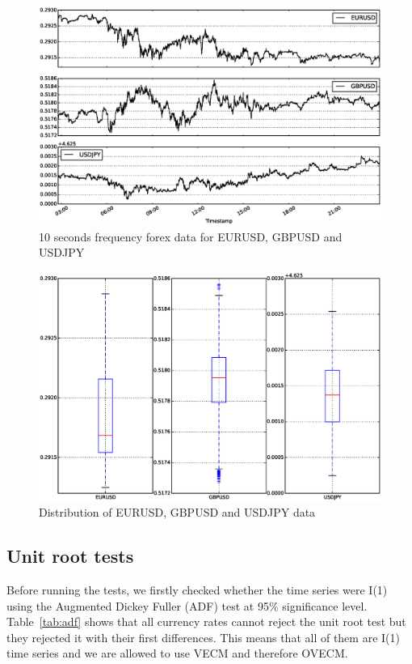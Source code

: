 \documentclass[twocolumn]{svjour3}          %
\begin{document}
\hspace*{-1.5in}
\begin{figure}[!ht]
  \vspace*{-1cm}
  \hspace*{-0.4in}
  \centering
  \includegraphics[scale=0.34]{forexdata}
  \caption{10 seconds frequency forex data for EURUSD, GBPUSD and USDJPY}
  \label{fig:forexdata}
\end{figure}

\begin{figure}[!ht]
  \vspace*{-1cm}
  \hspace*{-0.3in}
  \centering
  \includegraphics[scale=0.3]{distdata}
  \caption{Distribution of EURUSD, GBPUSD and USDJPY data}
  \label{fig:distdata}
\end{figure}

\subsection{Unit root tests} \label{sec:unitroot}
Before running the tests, we firstly checked whether the time series were
I(1) using the Augmented Dickey Fuller (ADF) test at 95\% significance level.
Table~\ref{tab:adf} shows that all currency rates cannot reject the unit root
test but they rejected it with their first differences. This means that all of
them are I(1) time series and we are allowed to use VECM and therefore OVECM.
\end{document}
